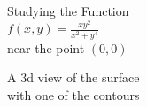 \documentclass[aspectratio=169]{beamer}
\begin{document}
\begin{frame}[plain]
    \begin{center}
        {\Large Studying the Function}\\[1cm]
        $\displaystyle f(x,y) = \frac{xy^2}{x^2 + y^4}$\\[1cm]
        near the point $(0,0)$
    \end{center}
\end{frame}
\begin{frame}
    \begin{center}
        {\large A 3d view of the surface}\\
        with one of the contours
    \end{center}
\end{frame}
\end{document}
